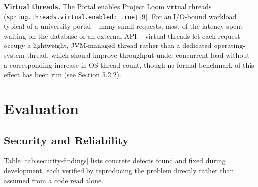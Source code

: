 \documentclass[12pt,a4paper]{report}
\begin{document}
\textbf{Virtual threads.} The Portal enables Project Loom virtual
threads (\texttt{spring.threads.virtual.enabled: true}) [9]. For an
I/O-bound workload typical of a university portal -- many small
requests, most of the latency spent waiting on the database or an
external API -- virtual threads let each request occupy a lightweight,
JVM-managed thread rather than a dedicated operating-system thread,
which should improve throughput under concurrent load without a
corresponding increase in OS thread count, though no formal benchmark
of this effect has been run (see Section 5.2.2).

\section{Evaluation}

\subsection{Security and Reliability}

Table \ref{tab:security-findings} lists concrete defects found and
fixed during development, each verified by reproducing the problem
directly rather than assumed from a code read alone.
\end{document}

